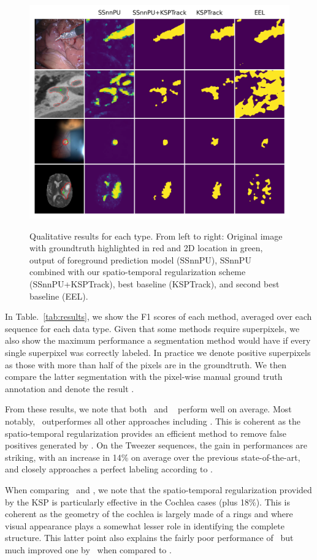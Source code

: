 \begin{figure}[t]
\caption{Qualitative results for each type. From left to right: Original image with groundtruth highlighted in red and 2D location in green, output of foreground prediction model (SSnnPU), SSnnPU combined with our spatio-temporal regularization scheme (SSnnPU+KSPTrack), best baseline (KSPTrack), and second best baseline (EEL).}
\centering
    \includegraphics[width=.8\textwidth]{pics/prevs.png}
\label{fig:prevs}
\end{figure}

In Table.~\ref{tab:results}, we show the F1 scores of each method, averaged over each sequence for each data type. Given that some methods require superpixels, we also show the maximum performance a segmentation method would have if every single superpixel was correctly labeled. In practice we denote positive superpixels as those with more than half of the pixels are in the groundtruth. We then compare the latter segmentation with the pixel-wise manual ground truth annotation and denote the result \MaxSP.

From these results, we note that both \SSnnPU~and \SSnnPUKSP~ perform well on average. Most notably, \SSnnPUKSP~outperformes all other approaches including \SSnnPU. This is coherent as the spatio-temporal regularization provides an efficient method to remove false positives generated by \SSnnPU. On the Tweezer sequences, the gain in performances are striking, with an increase in 14\% on average over the previous state-of-the-art, and closely approaches a perfect labeling according to \MaxSP.

When comparing \SSnnPU~and \SSnnPUKSP, we note that the spatio-temporal regularization provided by the KSP is particularly effective in the Cochlea cases (\ie plus 18\%). This is coherent as the geometry of the cochlea is largely made of a rings and where visual appearance plays a somewhat lesser role in identifying the complete structure. This latter point also explains the fairly poor performance of \SSnnPU~but much improved one by \SSnnPUKSP~when compared to \KSPTrack. 

